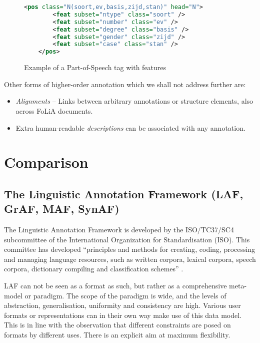 \documentclass[a4paper,10pt,twoside]{article}
\begin{document}
\begin{figure}[tbh]
\begin{lstlisting}[language=xml]
    <pos class="N(soort,ev,basis,zijd,stan)" head="N">
        <feat subset="ntype" class="soort" />
        <feat subset="number" class="ev" />
        <feat subset="degree" class="basis" />
        <feat subset="gender" class="zijd" />
        <feat subset="case" class="stan" />
    </pos>
\end{lstlisting}
\caption{Example of a Part-of-Speech tag with features\label{fig:features}}
\end{figure}

Other forms of higher-order annotation which we shall not address further are:

\begin{itemize}
  \item \emph{Alignments} -- Links \cite{XLINK} between arbitrary annotations or structure
elements, also across FoLiA documents.  
  \item Extra human-readable \emph{descriptions} can be associated with any annotation.
\end{itemize}


\section{Comparison}
\label{sec:comparison}

\subsection{The Linguistic Annotation Framework (LAF, GrAF, MAF, SynAF)}
\label{sec:LAF}

The Linguistic Annotation Framework is developed by the ISO/TC37/SC4
subcommittee of the International Organization for Standardisation (ISO). This
committee has developed ``principles and methods for creating, coding,
processing and managing language resources, such as written corpora, lexical
corpora, speech corpora, dictionary compiling and classification schemes''
\cite{LAF}. 

LAF can not be seen as a format as such, but rather as a comprehensive
meta-model or paradigm. The scope of the paradigm is wide, and the levels of
abstraction, generalisation, uniformity and consistency are high. Various user
formats or representations can in their own way make use of this data model.
This is in line with the observation that different constraints are posed on
formats by different uses.  There is an explicit aim at maximum flexibility. 
\end{document}

